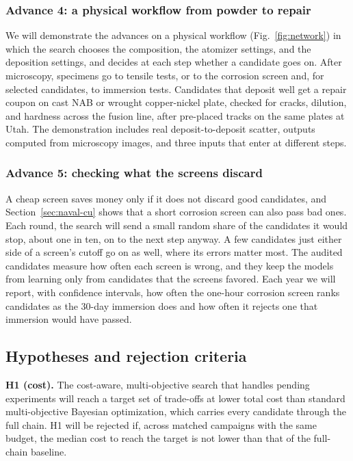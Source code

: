 \documentclass[12pt,letterpaper]{article}
\begin{document}
\subsubsection{Advance 4: a physical workflow from powder to repair}
We will demonstrate the advances on a physical workflow (Fig.~\ref{fig:network})
in which the search chooses the composition, the atomizer settings, and the
deposition settings, and decides at each step whether a candidate goes on.
After microscopy, specimens go to tensile tests, or to the corrosion screen
and, for selected candidates, to immersion tests. Candidates that deposit well
get a repair coupon on cast NAB or wrought copper-nickel plate, checked for
cracks, dilution, and hardness across the fusion line, after pre-placed
tracks on the same plates at Utah. The demonstration includes real
deposit-to-deposit scatter, outputs computed from microscopy images, and
three inputs that enter at different steps.

\subsubsection{Advance 5: checking what the screens discard}
A cheap screen saves money only if it does not discard good candidates, and
Section~\ref{sec:naval-cu} shows that a short corrosion screen can also pass
bad ones. Each round, the search will send a small random share of the
candidates it would stop, about one in ten, on to the next step anyway. A few
candidates just either side of a screen's cutoff go on as well, where its
errors matter most. The audited candidates measure how often each screen is
wrong, and they keep the models from learning only from candidates that the
screens favored. Each year we will report, with confidence intervals, how
often the one-hour corrosion screen ranks candidates as the 30-day immersion
does and how often it rejects one that immersion would have passed.

\subsection{Hypotheses and rejection criteria}

\textbf{H1 (cost).} The cost-aware, multi-objective search that handles
pending experiments will reach a target set of trade-offs at lower total
cost than standard multi-objective Bayesian optimization, which carries
every candidate through the full chain. H1 will be rejected if, across
matched campaigns with the same budget, the median cost to reach the target is
not lower than that of the full-chain baseline.
\end{document}
